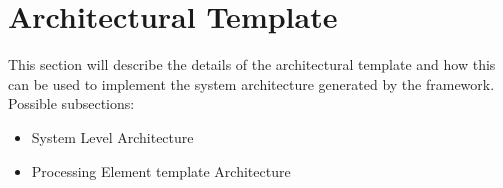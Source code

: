 \section{Architectural Template}
\label{sec:arch_template}
This section will describe the details of the architectural template and how this can be used to implement the system architecture generated by the framework.
\\
Possible subsections:
\begin{itemize}
	\item System Level Architecture
	\item Processing Element template Architecture
\end{itemize}
